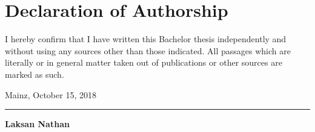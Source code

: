 
\chapter*{Declaration of Authorship}

I hereby confirm that I have written this Bachelor thesis independently and without using any sources other than those indicated. All passages which are literally or in general matter
taken out of publications or other sources are marked as such.
\vspace{0.5cm}

Mainz, October 15, 2018 \vspace{1.5cm} 


\noindent\rule{9cm}{0.5pt} \vspace{0.1cm}

\bf{Laksan Nathan}